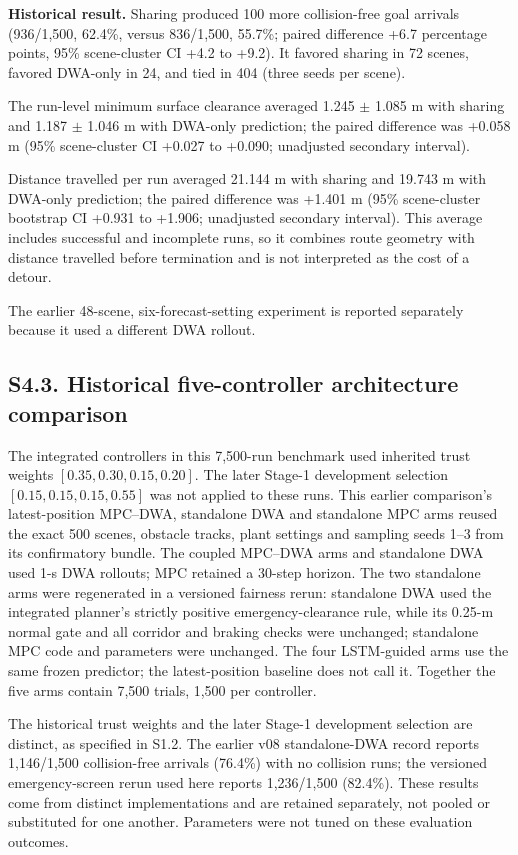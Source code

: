 \documentclass[10pt]{article}
\begin{document}
\noindent\textbf{Historical result.} Sharing produced 100 more collision-free goal arrivals (936/1,500, 62.4\%, versus 836/1,500, 55.7\%; paired difference +6.7 percentage points, 95\% scene-cluster CI +4.2 to +9.2). It favored sharing in 72 scenes, favored DWA-only in 24, and tied in 404 (three seeds per scene).

The run-level minimum surface clearance averaged 1.245 $\pm$ 1.085 m with sharing and 1.187 $\pm$ 1.046 m with DWA-only prediction; the paired difference was +0.058 m (95\% scene-cluster CI +0.027 to +0.090; unadjusted secondary interval).

Distance travelled per run averaged 21.144 m with sharing and 19.743 m with DWA-only prediction; the paired difference was +1.401 m (95\% scene-cluster bootstrap CI +0.931 to +1.906; unadjusted secondary interval). This average includes successful and incomplete runs, so it combines route geometry with distance travelled before termination and is not interpreted as the cost of a detour.

The earlier 48-scene, six-forecast-setting experiment is reported separately because it used a different DWA rollout.

\subsection*{S4.3. Historical five-controller architecture comparison}
The integrated controllers in this 7,500-run benchmark used inherited trust weights $[0.35,0.30,0.15,0.20]$. The later Stage-1 development selection $[0.15,0.15,0.15,0.55]$ was not applied to these runs.
This earlier comparison's latest-position MPC--DWA, standalone DWA and standalone MPC arms reused the exact 500 scenes, obstacle tracks, plant settings and sampling seeds 1--3 from its confirmatory bundle. The coupled MPC--DWA arms and standalone DWA used 1-s DWA rollouts; MPC retained a 30-step horizon. The two standalone arms were regenerated in a versioned fairness rerun: standalone DWA used the integrated planner's strictly positive emergency-clearance rule, while its 0.25-m normal gate and all corridor and braking checks were unchanged; standalone MPC code and parameters were unchanged. The four LSTM-guided arms use the same frozen predictor; the latest-position baseline does not call it. Together the five arms contain 7,500 trials, 1,500 per controller.

The historical trust weights and the later Stage-1 development selection are distinct, as specified in S1.2. The earlier v08 standalone-DWA record reports 1,146/1,500 collision-free arrivals (76.4\%) with no collision runs; the versioned emergency-screen rerun used here reports 1,236/1,500 (82.4\%). These results come from distinct implementations and are retained separately, not pooled or substituted for one another. Parameters were not tuned on these evaluation outcomes.
\end{document}
